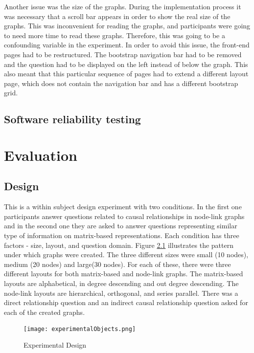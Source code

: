 \documentclass{l4proj}
\begin{document}
Another issue was the size of the graphs. During the implementation process it was necessary that a scroll bar appears in order to show the real size of the graphs. This was inconvenient for reading the graphs, and participants were going to need more time to read these graphs. Therefore, this was going to be a confounding variable in the experiment. In order to avoid this issue, the front-end pages had to be restructured. The bootstrap navigation bar had to be removed and the question had to be displayed on the left instead of below the graph. This also meant that this particular sequence of pages had to extend a different layout page, which does not contain the navigation bar and has a different bootstrap grid.

\section{Software reliability testing}

\chapter{Evaluation}
\section{Design}

This is a within subject design experiment with two conditions. In the first one participants answer questions related to causal relationships in node-link graphs and in the second one they are asked to answer questions representing similar type of information on matrix-based representations. Each condition has three factors - size, layout, and question domain. Figure \ref{experimentalDesign} illustrates the pattern under which graphs were created. The three different sizes were small (10 nodes), medium (20 nodes) and large(30 nodes). For each of these, there were three different layouts for both matrix-based and node-link graphs. The matrix-based layouts are alphabetical, in degree descending and out degree descending. The node-link layouts are hierarchical, orthogonal, and series parallel.  There was a direct relationship question and an indirect causal relationship question asked for each of the created graphs.

\begin{figure}[H]
\centering
\texttt{[image: experimentalObjects.png]}
\caption{Experimental Design}
\label{experimentalDesign}
\end{figure}
\end{document}
